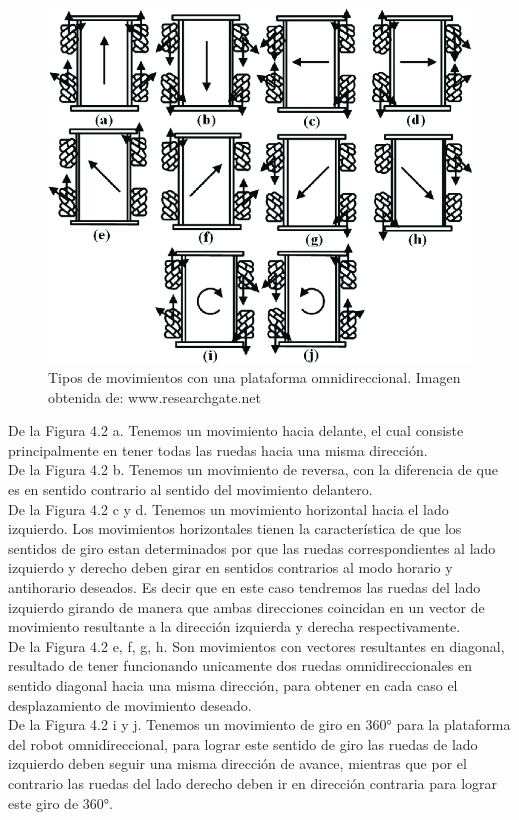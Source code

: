 \documentclass[12pt]{book} %
\begin{document}
\begin{figure}[H]
\centering
\includegraphics[scale=0.4]{Fig-5-Top-view-of-turning-principle-of-Mecanum-wheel.png} 
\caption{Tipos de movimientos con una plataforma omnidireccional. Imagen obtenida de: www.researchgate.net} 
\end{figure}

De la Figura 4.2 a. Tenemos un movimiento hacia delante, el cual consiste principalmente en tener todas las ruedas hacia una misma dirección.\\
De la Figura 4.2 b. Tenemos un movimiento de reversa, con la diferencia de que es en sentido contrario al sentido del movimiento delantero.\\
De la Figura 4.2 c y d. Tenemos un movimiento horizontal hacia el lado izquierdo. Los movimientos horizontales tienen la característica de que los sentidos de giro estan determinados por que las ruedas correspondientes al lado izquierdo y derecho deben girar en sentidos contrarios al modo horario y antihorario deseados. Es decir que en este caso tendremos las ruedas del lado izquierdo girando de manera que ambas direcciones coincidan en un vector de movimiento resultante a la dirección izquierda y derecha respectivamente.\\
De la Figura 4.2 e, f, g, h. Son movimientos con vectores resultantes en diagonal, resultado de tener funcionando unicamente dos ruedas omnidireccionales en sentido diagonal hacia una misma dirección, para obtener en cada caso el desplazamiento de movimiento deseado.\\
De la Figura 4.2 i y j. Tenemos un movimiento de giro en 360° para la plataforma del robot omnidireccional, para lograr este sentido de giro las ruedas de lado izquierdo deben seguir una misma dirección de avance, mientras que por el contrario las ruedas del lado derecho deben ir en dirección contraria para lograr este giro de 360°.
\end{document}
